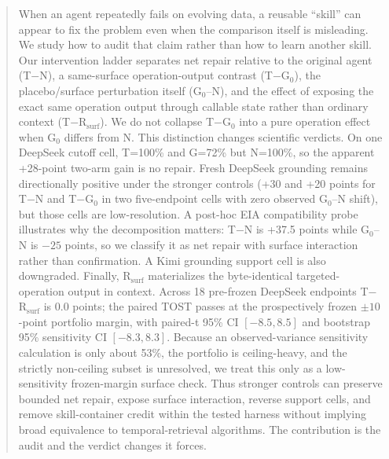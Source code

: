 \begin{abstract}
When an agent repeatedly fails on evolving data, a reusable ``skill'' can appear to fix the problem even when the comparison itself is misleading. We study how to audit that claim rather than how to learn another skill. Our intervention ladder separates net repair relative to the original agent (T$-$N), a same-surface operation-output contrast (T$-$G$_0$), the placebo/surface perturbation itself (G$_0$--N), and the effect of exposing the exact same operation output through callable state rather than ordinary context (T$-$R$_{\mathrm{surf}}$). We do not collapse T$-$G$_0$ into a pure operation effect when G$_0$ differs from N. This distinction changes scientific verdicts. On one DeepSeek cutoff cell, T=100\% and G=72\% but N=100\%, so the apparent +28-point two-arm gain is no repair. Fresh DeepSeek grounding remains directionally positive under the stronger controls (+30 and +20 points for T$-$N and T$-$G$_0$ in two five-endpoint cells with zero observed G$_0$--N shift), but those cells are low-resolution. A post-hoc EIA compatibility probe illustrates why the decomposition matters: T$-$N is +37.5 points while G$_0$--N is $-25$ points, so we classify it as net repair with surface interaction rather than confirmation. A Kimi grounding support cell is also downgraded. Finally, R$_{\mathrm{surf}}$ materializes the byte-identical targeted-operation output in context. Across 18 pre-frozen DeepSeek endpoints T$-$R$_{\mathrm{surf}}$ is 0.0 points; the paired TOST passes at the prospectively frozen $\pm10$-point portfolio margin, with paired-t 95\% CI $[-8.5,8.5]$ and bootstrap 95\% sensitivity CI $[-8.3,8.3]$. Because an observed-variance sensitivity calculation is only about 53\%, the portfolio is ceiling-heavy, and the strictly non-ceiling subset is unresolved, we treat this only as a low-sensitivity frozen-margin surface check. Thus stronger controls can preserve bounded net repair, expose surface interaction, reverse support cells, and remove skill-container credit within the tested harness without implying broad equivalence to temporal-retrieval algorithms. The contribution is the audit and the verdict changes it forces.
\end{abstract}
